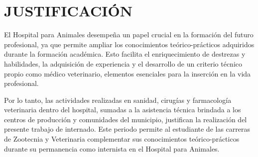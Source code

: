 \clearpage

\section{JUSTIFICACIÓN}

El Hospital para Animales desempeña un papel crucial en la formación del futuro profesional, ya que permite ampliar los conocimientos teórico-prácticos adquiridos durante la formación académica. Esto facilita el enriquecimiento de destrezas y habilidades, la adquisición de experiencia y el desarrollo de un criterio técnico propio como médico veterinario, elementos esenciales para la inserción en la vida profesional.

Por lo tanto, las actividades realizadas en sanidad, cirugías y farmacología veterinaria dentro del hospital, sumadas a la asistencia técnica brindada a los centros de producción y comunidades del municipio, justifican la realización del presente trabajo de internado. Este periodo permite al estudiante de las carreras de Zootecnia y Veterinaria complementar sus conocimientos teórico-prácticos durante su permanencia como internista en el Hospital para Animales.

